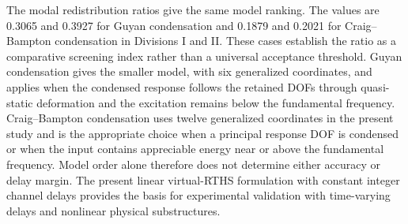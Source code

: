 \documentclass[11pt,a4paper]{article}
\numberwithin{equation}{section}
\begin{document}
The modal redistribution ratios give the same model ranking. The values are 0.3065 and 0.3927 for Guyan condensation and 0.1879 and 0.2021 for Craig--Bampton condensation in Divisions I and II. These cases establish the ratio as a comparative screening index rather than a universal acceptance threshold. Guyan condensation gives the smaller model, with six generalized coordinates, and applies when the condensed response follows the retained DOFs through quasi-static deformation and the excitation remains below the fundamental frequency. Craig--Bampton condensation uses twelve generalized coordinates in the present study and is the appropriate choice when a principal response DOF is condensed or when the input contains appreciable energy near or above the fundamental frequency. Model order alone therefore does not determine either accuracy or delay margin. The present linear virtual-RTHS formulation with constant integer channel delays provides the basis for experimental validation with time-varying delays and nonlinear physical substructures.
\end{document}
